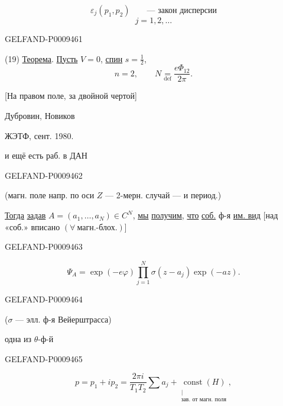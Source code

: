 \begin{equation*}
 \varepsilon_j(p_1,p_2)\qquad\text{--- закон дисперсии}
 \tag{18}
\end{equation*}
\[
 j=1,2,\ldots
\]

\begin{GelfandAdjacentEvidence}{GELFAND-P000946}{1}

(19) \underline{Теорема}. \underline{Пусть} $V=0$, \underline{спин} $s=\frac12$,
\[
 n=2,\qquad N\underset{\mathrm{def}}{=}\frac{e\Phi_{12}}{2\pi}.
\]

[На правом поле, за двойной чертой]\par
Дубровин, Новиков\par
ЖЭТФ, сент. 1980.\par
и ещё есть раб. в ДАН
\end{GelfandAdjacentEvidence}
\begin{GelfandAdjacentEvidence}{GELFAND-P000946}{2}


(магн. поле напр. по оси $Z$ --- 2-мерн. случай --- и период.)

\underline{Тогда} \underline{задав} $A=(a_1,\ldots,a_N)\in C^N$, \underline{мы} \underline{получим}, \underline{что} \underline{соб.} ф-я \underline{им. вид}
[над «соб.» вписано $(\forall\ \text{магн.-блох.})$]
\end{GelfandAdjacentEvidence}
\begin{GelfandAdjacentEvidence}{GELFAND-P000946}{3}


\begin{equation*}
 \Psi_A=\exp(-e\varphi)\prod_{j=1}^N\sigma(z-a_j)\exp(-az).
 \tag{20}
\end{equation*}
\end{GelfandAdjacentEvidence}
\begin{GelfandAdjacentEvidence}{GELFAND-P000946}{4}

($\sigma$ --- элл. ф-я Вейерштрасса)\par
одна из $\theta$-ф-й
\end{GelfandAdjacentEvidence}
\begin{GelfandAdjacentEvidence}{GELFAND-P000946}{5}


\begin{equation*}
 p=p_1+ip_2=\frac{2\pi i}{T_1T_2}\sum a_j+
 \underset{\substack{\vert\\\text{зав. от магн. поля}}}{\operatorname{const}(H)},
 \tag{21}
\end{equation*}
\end{GelfandAdjacentEvidence}
